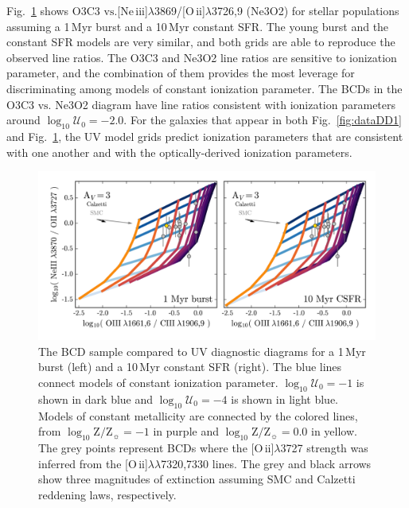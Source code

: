 \documentclass[preprint2,trackchanges]{aastex62}
\newcommand{\oii}{[O\,{\sc ii}]\xspace}
\newcommand{\neiii}{[Ne\,{\sc iii}]\xspace}
\newcommand\vs{\ensuremath{\mathrm{vs.}}\xspace}
\newcommand{\Myr}{$\,$Myr\xspace}
\newcommand{\logten}{\ensuremath{\log_{10}}}
\newcommand{\logZeq}[1]{\ensuremath{\logten \mathrm{Z}/\mathrm{Z}_{\sun} = #1}}
\newcommand{\logUeq}[1]{\ensuremath{\logten \mathcal{U}_0 = #1}}
\begin{document}
Fig.~\ref{fig:dataDD2} shows O3C3 \vs \neiii$\lambda$3869/\oii$\lambda$3726,9 (Ne3O2) for stellar populations assuming a 1\Myr burst and a 10\Myr constant SFR. The young burst and the constant SFR models are very similar, and both grids are able to reproduce the observed line ratios. The O3C3 and Ne3O2 line ratios are sensitive to ionization parameter, and the combination of them provides the most leverage for discriminating among models of constant ionization parameter. The BCDs in the O3C3 \vs Ne3O2 diagram have line ratios consistent with ionization parameters around \logUeq{-2.0}. For the galaxies that appear in both Fig.~\ref{fig:dataDD1} and Fig.~\ref{fig:dataDD2}, the UV model grids predict ionization parameters that are consistent with one another and with the optically-derived ionization parameters.

\begin{figure}
  \begin{center}
    \includegraphics[width=\linewidth]{figs/f14.png}
    \caption{The \citet{Berg+2016} BCD sample compared to UV diagnostic diagrams for a 1\Myr burst (left) and a 10\Myr constant SFR (right). The blue lines connect models of constant ionization parameter. \logUeq{-1} is shown in dark blue and \logUeq{-4} is shown in light blue. Models of constant metallicity are connected by the colored lines, from \logZeq{-1} in purple and \logZeq{0.0} in yellow. The grey points represent BCDs where the \oii$\lambda$3727 strength was inferred from the \oii$\lambda\lambda$7320,7330 lines. The grey and black arrows show three magnitudes of extinction assuming SMC and Calzetti reddening laws, respectively.}
    \label{fig:dataDD2}
  \end{center}
\end{figure}
\end{document}
